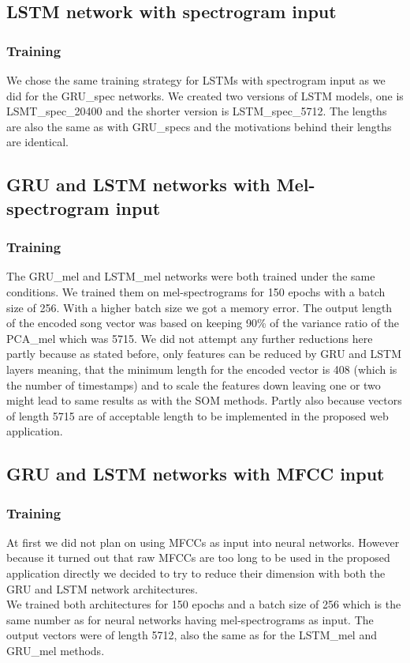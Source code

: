\subsection{LSTM network with spectrogram input}\label{ssec:LSTM_spec_experiments}

\subsubsection{Training}
We chose the same training strategy for LSTMs with spectrogram input as we did for the GRU\_spec networks. We created two versions of LSTM models, one is LSMT\_spec\_20400 and the shorter version is LSTM\_spec\_5712. The lengths are also the same as with GRU\_specs and the motivations behind their lengths are identical.

\subsection{GRU and LSTM networks with Mel-spectrogram input}\label{ssec:GRU_LSTM_mel_experiments}

\subsubsection{Training}
The GRU\_mel and LSTM\_mel networks were both trained under the same conditions. We trained them on mel-spectrograms for 150 epochs with a batch size of 256. With a higher batch size we got a memory error. The output length of the encoded song vector was based on keeping 90\% of the variance ratio of the PCA\_mel which was 5715. We did not attempt any further reductions here partly because as stated before, only features can be reduced by GRU and LSTM layers meaning, that the minimum length for the encoded vector is 408 (which is the number of timestamps) and to scale the features down leaving one or two might lead to same results as with the SOM methods. Partly also because vectors of length 5715 are of acceptable length to be implemented in the proposed web application.

\subsection{GRU and LSTM networks with MFCC input}\label{ssec:GRU_LSTM_MFCC_experiments}

\subsubsection{Training}
At first we did not plan on using MFCCs as input into neural networks. However because it turned out that raw MFCCs are too long to be used in the proposed application directly we decided to try to reduce their dimension with both the GRU and LSTM network architectures. \\ 
We trained both architectures for 150 epochs and a batch size of 256 which is the same number as for neural networks having mel-spectrograms as input. The output vectors were of length 5712, also the same as for the LSTM\_mel and GRU\_mel methods. \\

